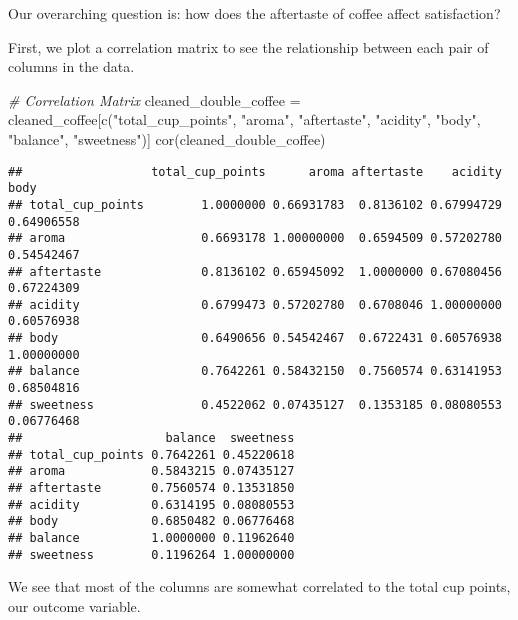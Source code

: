 \documentclass[
]{article}
\newenvironment{Shaded}{\begin{snugshade}}{\end{snugshade}}
\newcommand{\CommentTok}[1]{\textcolor[rgb]{0.56,0.35,0.01}{\textit{#1}}}
\newcommand{\FunctionTok}[1]{\textcolor[rgb]{0.00,0.00,0.00}{#1}}
\newcommand{\NormalTok}[1]{#1}
\newcommand{\OtherTok}[1]{\textcolor[rgb]{0.56,0.35,0.01}{#1}}
\newcommand{\StringTok}[1]{\textcolor[rgb]{0.31,0.60,0.02}{#1}}
\begin{document}
Our overarching question is: how does the aftertaste of coffee affect
satisfaction?

First, we plot a correlation matrix to see the relationship between each
pair of columns in the data.

\begin{Shaded}
\begin{Highlighting}[]
\CommentTok{\# Correlation Matrix }
\NormalTok{cleaned\_double\_coffee }\OtherTok{=}\NormalTok{ cleaned\_coffee[}\FunctionTok{c}\NormalTok{(}\StringTok{"total\_cup\_points"}\NormalTok{, }\StringTok{"aroma"}\NormalTok{, }\StringTok{"aftertaste"}\NormalTok{, }\StringTok{"acidity"}\NormalTok{, }\StringTok{"body"}\NormalTok{, }\StringTok{"balance"}\NormalTok{, }\StringTok{"sweetness"}\NormalTok{)]}
\FunctionTok{cor}\NormalTok{(cleaned\_double\_coffee)}
\end{Highlighting}
\end{Shaded}

\begin{verbatim}
##                  total_cup_points      aroma aftertaste    acidity       body
## total_cup_points        1.0000000 0.66931783  0.8136102 0.67994729 0.64906558
## aroma                   0.6693178 1.00000000  0.6594509 0.57202780 0.54542467
## aftertaste              0.8136102 0.65945092  1.0000000 0.67080456 0.67224309
## acidity                 0.6799473 0.57202780  0.6708046 1.00000000 0.60576938
## body                    0.6490656 0.54542467  0.6722431 0.60576938 1.00000000
## balance                 0.7642261 0.58432150  0.7560574 0.63141953 0.68504816
## sweetness               0.4522062 0.07435127  0.1353185 0.08080553 0.06776468
##                    balance  sweetness
## total_cup_points 0.7642261 0.45220618
## aroma            0.5843215 0.07435127
## aftertaste       0.7560574 0.13531850
## acidity          0.6314195 0.08080553
## body             0.6850482 0.06776468
## balance          1.0000000 0.11962640
## sweetness        0.1196264 1.00000000
\end{verbatim}

We see that most of the columns are somewhat correlated to the total cup
points, our outcome variable.
\end{document}
